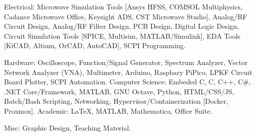 

\begin{cvskills}

  \cvskill
    {Electrical:} %
    {Microwave Simulation Tools [Ansys HFSS, COMSOL Multiphysics, Cadance Microwave Office, Keysight ADS, CST Microwave Studio], Analog/RF Circuit Design, Analog/RF Filter Design, PCB Design, Digital Logic Design, Circuit Simulation Tools [SPICE, Multisim, MATLAB/Simulink], EDA Tools [KiCAD, Altium, OrCAD, AutoCAD], SCPI Programming.} %

\cvskill
    {Hardware:}
    {Oscilloscope, Function/Signal Generator, Spectrum Analyzer, Vector Network Analyzer (VNA), Multimeter, Arduino, Raspbary PiPico, LPKF Circuit Board Plotter, SCPI Automation. }
  \cvskill
    {Computer Science:} %
    {Embeded C, C, C++, C\#, .NET Core/Framework, MATLAB, GNU Octave, Python, HTML/CSS/JS, Batch/Bash Scripting, Networking, Hypervisor/Containerization [Docker, Proxmox].} %
  \cvskill
    {Academic:} %
    {\LaTeX, MATLAB, Mathematica, Office Suite.} %


  \cvskill
    {Misc:} %
    {Graphic Design, Teaching Material.} %
\end{cvskills}

